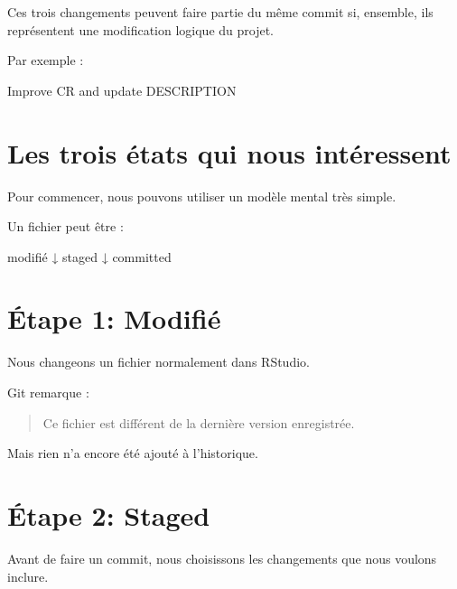 \documentclass[
  letterpaper,
  DIV=11,
  numbers=noendperiod]{scrreprt}
\newenvironment{Shaded}{\begin{snugshade}}{\end{snugshade}}
\newcommand{\NormalTok}[1]{\textcolor[rgb]{0.00,0.23,0.31}{#1}}
\begin{document}
Ces trois changements peuvent faire partie du même commit si, ensemble,
ils représentent une modification logique du projet.

Par exemple :

\begin{Shaded}
\begin{Highlighting}[]
\NormalTok{Improve CR and update DESCRIPTION}
\end{Highlighting}
\end{Shaded}

\section{Les trois états qui nous
intéressent}\label{les-trois-uxe9tats-qui-nous-intuxe9ressent}

Pour commencer, nous pouvons utiliser un modèle mental très simple.

Un fichier peut être :

\begin{Shaded}
\begin{Highlighting}[]
\NormalTok{modifié}
\NormalTok{   ↓}
\NormalTok{staged}
\NormalTok{   ↓}
\NormalTok{committed}
\end{Highlighting}
\end{Shaded}

\section*{Étape 1: Modifié}\label{uxe9tape-1-modifiuxe9}


Nous changeons un fichier normalement dans RStudio.

Git remarque :

\begin{quote}
Ce fichier est différent de la dernière version enregistrée.
\end{quote}

Mais rien n'a encore été ajouté à l'historique.

\section*{Étape 2: Staged}\label{uxe9tape-2-staged}


Avant de faire un commit, nous choisissons les changements que nous
voulons inclure.
\end{document}
